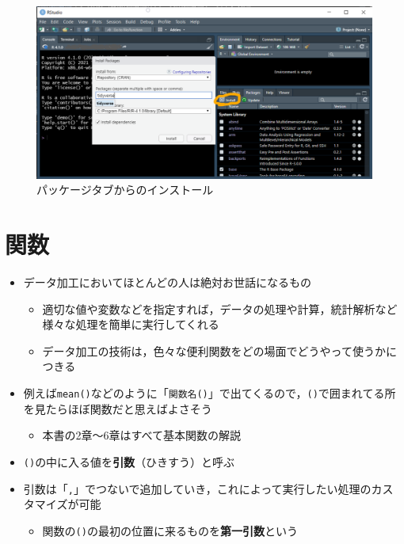 \documentclass[
  xelatex,ja=standard, b5paper]{bxjsbook}
\providecommand{\tightlist}{%
  \setlength{\itemsep}{0pt}\setlength{\parskip}{0pt}}
\begin{document}
\begin{figure}

{\centering \includegraphics[width=0.8\linewidth]{images/package_install} 

}

\caption{パッケージタブからのインストール}\label{fig:pinst}
\end{figure}

\hypertarget{p-function}{%
\section{関数}\label{p-function}}

\begin{itemize}
\tightlist
\item
  データ加工においてほとんどの人は絶対お世話になるもの

  \begin{itemize}
  \tightlist
  \item
    適切な値や変数などを指定すれば，データの処理や計算，統計解析など様々な処理を簡単に実行してくれる
  \item
    データ加工の技術は，色々な便利関数をどの場面でどうやって使うかにつきる
  \end{itemize}
\item
  例えば\texttt{mean()}などのように「\texttt{関数名()}」で出てくるので，\texttt{()}で囲まれてる所を見たらほぼ関数だと思えばよさそう

  \begin{itemize}
  \tightlist
  \item
    本書の2章～6章はすべて基本関数の解説
  \end{itemize}
\item
  \texttt{()}の中に入る値を\textbf{引数}（ひきすう）と呼ぶ
\item
  引数は「\texttt{,}」でつないで追加していき，これによって実行したい処理のカスタマイズが可能

  \begin{itemize}
  \tightlist
  \item
    関数の\texttt{()}の最初の位置に来るものを\textbf{第一引数}という
  \end{itemize}
\end{itemize}
\end{document}
